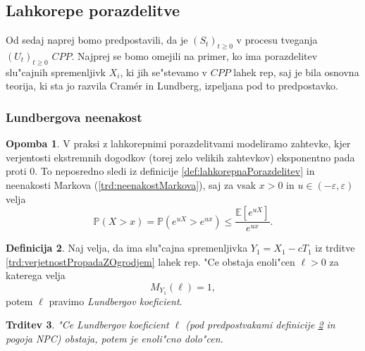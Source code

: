 \documentclass[12pt, a4paper, reqno]{amsart}
\theoremstyle{definition}
\newtheorem{definicija}{Definicija}[section]
\newtheorem{opomba}[definicija]{Opomba}
\theoremstyle{plain}
\newtheorem{trditev}[definicija]{Trditev}
\newcommand{\E}{\mathbb{E}}
\newcommand{\Prob}{\mathbb{P}}
\newcommand{\1}{\mathds{1}}
\begin{document}
    \subsection{Lahkorepe porazdelitve}
        Od sedaj naprej bomo predpostavili, da je $(S_t)_{t\geq0}$ v procesu tveganja $(U_t)_{t\geq0}$ $CPP$.
        Najprej se bomo omejili na primer, ko ima porazdelitev slu"cajnih spremenljivk $X_i$, ki jih 
        se"stevamo v $CPP$ lahek rep, saj je bila osnovna teorija, ki sta jo razvila Cramér in Lundberg,
        izpeljana pod to predpostavko.
        \subsubsection{Lundbergova neenakost}

            \begin{opomba}
                V praksi z lahkorepnimi porazdelitvami modeliramo zahtevke, kjer verjentosti ekstremnih 
                dogodkov (torej zelo velikih zahtevkov) eksponentno pada proti $0$. To neposredno sledi iz 
                definicije \ref{def:lahkorepnaPorazdelitev} in neenakosti Markova (\ref{trd:neenakostMarkova}), 
                saj za vsak 
                $x>0$ in $u\in(-\varepsilon, \varepsilon)$ velja
                \begin{equation*}
                    \Prob\left(X > x\right) = \Prob\left(e^{uX} > e^{ux}\right) \leq \frac{\E\left[e^{uX}\right]}{e^{ux}}.
                \end{equation*}
                \label{op:lahkorepnaPorazdelitev}
            \end{opomba}

            \begin{definicija}
                Naj velja, da ima slu"cajna spremenljivka $Y_1 = X_1 - cT_1$ iz trditve \ref{trd:verjetnostPropadaZOgrodjem} 
                lahek rep. "Ce obstaja enoli"cen $\ell > 0$ za katerega velja
                \begin{equation*}
                    M_{Y_1}(\ell)  = 1,
                \end{equation*}
                potem $\ell$ pravimo \textit{Lundbergov koeficient}.
                \label{def:LundbergovKoeficient}
            \end{definicija}

            \begin{trditev}
                "Ce Lundbergov koeficient $\ell$ (pod predpostvakami definicije \ref{def:LundbergovKoeficient} in 
                pogoja NPC)
                obstaja, potem je enoli"cno dolo"cen.
                \label{trd:enolicnostLundbergovegaKoeficienta}
            \end{trditev}
\end{document}
